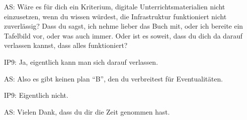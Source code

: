 \documentclass[fontsize=11pt,paper=a4]{scrbook}
\begin{document}
{\begin{itemize*}
\item[AS:] Wäre es für dich ein Kriterium, digitale Unterrichtsmaterialien nicht einzusetzen, wenn du wissen würdest, die Infrastruktur funktioniert nicht zuverlässig? Dass du sagst, ich nehme lieber das Buch mit, oder ich bereite ein Tafelbild vor, oder was auch immer. Oder ist es soweit, dass du dich da darauf verlassen kannst, dass alles funktioniert?
\item[IP9:] Ja, eigentlich kann man sich darauf verlassen.
\item[AS:] Also es gibt keinen plan "`B"', den du verbreitest für Eventualitäten.
\item[IP9:] Eigentlich nicht.
\item[AS:] Vielen Dank, dass du dir die Zeit genommen hast.
\end{itemize*} 
}

\nolinenumbers 
\end{document}
